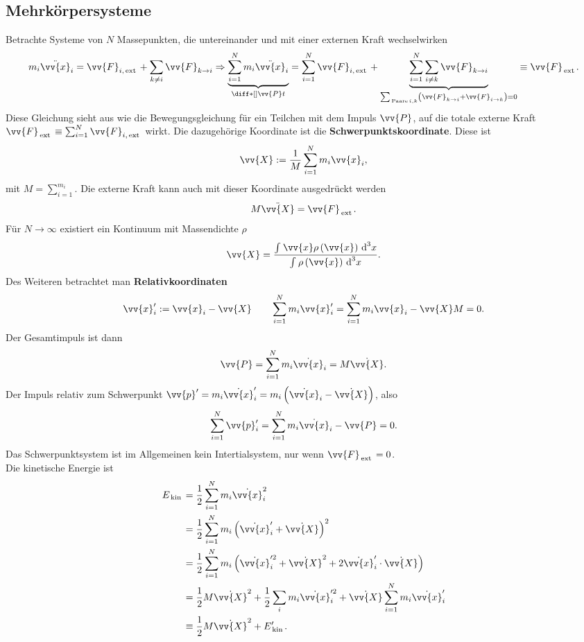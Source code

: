 \documentclass[a4paper,12pt]{article}
\newcommand{\td}{\,\text{d}}
\numberwithin{equation}{section}
\begin{document}
\subsection{Mehrkörpersysteme}
Betrachte Systeme von $N$ Massepunkten, die untereinander und mit einer externen Kraft wechselwirken
\[ 
        m_i\ddot{\vv{x}}_i=\vv{F}_{i,\,\text{ext}\,}+\sum_{k\neq i}^{}\vv{F}_{k\rightarrow i}\Rightarrow \underbrace{\sum_{i=1}^{N}m_i\ddot{\vv{x}}_i}_{\diff*[]{\vv{P}}{t}}=\sum_{i=1}^{N}\vv{F}_{i,\,\text{ext}\,}+\underbrace{\sum_{i=1}^{N}\sum_{i \neq k}^{}\vv{F}_{k\rightarrow i}}_{\sum_{\,\text{Paare}\,i,k}^{}\left(\vv{F}_{k\rightarrow i}+\vv{F}_{i\rightarrow k}\right)=0}\equiv \vv{F}_{\,\text{ext}\,}
.\] 
Diese Gleichung sieht aus wie die Bewegungsgleichung für ein Teilchen mit dem Impuls $\vv{P}$, auf die totale externe Kraft $\vv{F}_{\,\text{ext}\,}\equiv \sum_{i=1}^{N}\vv{F}_{i,\,\text{ext}\,}$ wirkt. Die dazugehörige Koordinate ist die \textbf{Schwerpunktskoordinate}. Diese ist
\[ 
        \vv{X}:=\dfrac{1}{M}\sum_{i=1}^{N}m_i\vv{x}_i
,\] 
mit $M=\sum_{i=1}^{m_i}$. Die externe Kraft kann auch mit dieser Koordinate ausgedrückt werden
\[ 
        M\ddot{\vv{X}}=\vv{F}_{\,\text{ext}\,}
.\] 
Für $N\rightarrow \infty$ existiert ein Kontinuum mit Massendichte $\rho $ 
\[ 
        \vv{X}=\dfrac{\int_{}^{}\vv{x}\rho \left(\vv{x}\right)\td ^3x}{\int_{}^{}\rho \left(\vv{x}\right)\td ^3x}
.\] 
\indent Des Weiteren betrachtet man \textbf{Relativkoordinaten} 
\[ 
        \vv{x}_i':=\vv{x}_i-\vv{X}\qquad \sum_{i=1}^{N}m_i\vv{x}_i'=\sum_{i=1}^{N}m_i\vv{x}_i-\vv{X}M=0
.\] 
Der Gesamtimpuls ist dann
\[ 
        \vv{P}=\sum_{i=1}^{N}m_i\dot{\vv{x}}_i=M\dot{\vv{X}}
.\] 
\indent Der Impuls relativ zum Schwerpunkt $\vv{p}'=m_i\dot{\vv{x}}_i'=m_i\left(\dot{\vv{x}}_i-\dot{\vv{X}}\right)$, also
\[ 
        \sum_{i=1}^{N}\vv{p}_i'=\sum_{i=1}^{N}m_i\dot{\vv{x}}_i-\vv{P}=0
.\] 
Das Schwerpunktsystem ist im Allgemeinen kein Intertialsystem, nur wenn $\vv{F}_{\,\text{ext}\,}=0$.\\\indent
Die kinetische Energie ist
\begin{align*}
        E_{\,\text{kin}\,}&=\dfrac{1}{2}\sum_{i=1}^{N}m_i\dot{\vv{x}}_i^2\\
                          &=\dfrac{1}{2}\sum_{i=1}^{N}m_i\left(\dot{\vv{x}}_i'+\dot{\vv{X}}\right)^2\\
                          &=\dfrac{1}{2}\sum_{i=1}^{N}m_i\left(\dot{\vv{x}}_i'^2+\dot{\vv{X}}^2+2\dot{\vv{x}}_i'\cdot \dot{\vv{X}}\right)\\
                          &=\dfrac{1}{2}M\dot{\vv{X}}^2+\dfrac{1}{2}\sum_{i}^{}m_i\dot{\vv{x}}_i'^2+\dot{\vv{X}}\sum_{i=1}^{N}m_i\dot{\vv{x}}_i'\\
                          &\equiv \dfrac{1}{2}M\dot{\vv{X}}^2+E_{\,\text{kin}\,}'
.\end{align*}
\end{document}
